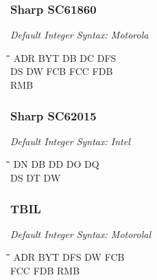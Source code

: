 \subsubsection{Sharp SC61860}

{\em Default Integer Syntax: Motorola}

{\tt\begin{tabbing}
\hspace{3cm}\=\hspace{3cm}\=\hspace{3cm}\=\hspace{3cm}\=\kill
ADR        \> BYT         \> DB          \> DC          \> DFS \\
DS         \> DW          \> FCB         \> FCC         \> FDB \\
RMB \\
\end{tabbing}}

\subsubsection{Sharp SC62015}

{\em Default Integer Syntax: Intel}

{\tt\begin{tabbing}
\hspace{3cm}\=\hspace{3cm}\=\hspace{3cm}\=\hspace{3cm}\=\kill
DN         \> DB          \> DD          \> DO          \> DQ \\
DS         \> DT          \> DW \\
\end{tabbing}}

\subsubsection{TBIL}

{\em Default Integer Syntax: Motorolal}

{\tt\begin{tabbing}
\hspace{3cm}\=\hspace{3cm}\=\hspace{3cm}\=\hspace{3cm}\=\kill
ADR        \> BYT         \> DFS         \> DW          \> FCB \\
FCC        \> FDB         \> RMB \\
\end{tabbing}}
